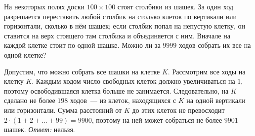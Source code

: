 На некоторых полях доски $100 \times 100$ стоят столбики из шашек.
За один ход разрешается переставить любой столбик на столько клеток по
вертикали или горизонтали, сколько в нём шашек;
если столбик попал на непустую клетку, он ставится на верх стоящего там
столбика и объединяется с ним.
Вначале на каждой клетке стоит по одной шашке.
Можно ли за $9999$ ходов собрать их все на одной клетке?

\solution
Допустим, что можно собрать все шашки на клетке $K$.
Рассмотрим все ходы на клетку $K$.
Каждым ходом число свободных клеток должно увеличиваться на 1, поэтому
освободившаяся клетка больше не занимается.
Следовательно, на $K$ сделано не более $198$ ходов~--- из клеток, находящихся
с $K$ на одной вертикали или горизонтали.
Сумма расстояний от $K$ до этих клеток не превосходит
$2 \cdot (1 + 2 + \ldots + 99) = 9900$,
поэтому на ней может собраться не более $9901$ шашек.
\emph{Ответ:} нельзя.

